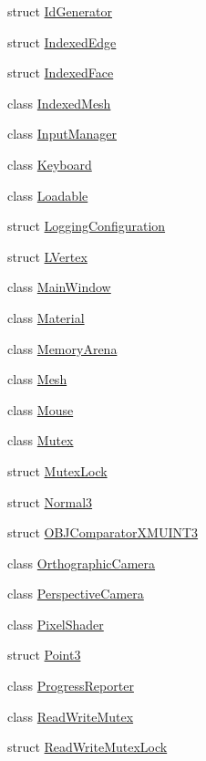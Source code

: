 \begin{DoxyCompactItemize}
struct \hyperlink{structmage_1_1_id_generator}{Id\+Generator}
\item 
struct \hyperlink{structmage_1_1_indexed_edge}{Indexed\+Edge}
\item 
struct \hyperlink{structmage_1_1_indexed_face}{Indexed\+Face}
\item 
class \hyperlink{classmage_1_1_indexed_mesh}{Indexed\+Mesh}
\item 
class \hyperlink{classmage_1_1_input_manager}{Input\+Manager}
\item 
class \hyperlink{classmage_1_1_keyboard}{Keyboard}
\item 
class \hyperlink{classmage_1_1_loadable}{Loadable}
\item 
struct \hyperlink{structmage_1_1_logging_configuration}{Logging\+Configuration}
\item 
struct \hyperlink{structmage_1_1_l_vertex}{L\+Vertex}
\item 
class \hyperlink{classmage_1_1_main_window}{Main\+Window}
\item 
class \hyperlink{classmage_1_1_material}{Material}
\item 
class \hyperlink{classmage_1_1_memory_arena}{Memory\+Arena}
\item 
class \hyperlink{classmage_1_1_mesh}{Mesh}
\item 
class \hyperlink{classmage_1_1_mouse}{Mouse}
\item 
class \hyperlink{classmage_1_1_mutex}{Mutex}
\item 
struct \hyperlink{structmage_1_1_mutex_lock}{Mutex\+Lock}
\item 
struct \hyperlink{structmage_1_1_normal3}{Normal3}
\item 
struct \hyperlink{structmage_1_1_o_b_j_comparator_x_m_u_i_n_t3}{O\+B\+J\+Comparator\+X\+M\+U\+I\+N\+T3}
\item 
class \hyperlink{classmage_1_1_orthographic_camera}{Orthographic\+Camera}
\item 
class \hyperlink{classmage_1_1_perspective_camera}{Perspective\+Camera}
\item 
class \hyperlink{classmage_1_1_pixel_shader}{Pixel\+Shader}
\item 
struct \hyperlink{structmage_1_1_point3}{Point3}
\item 
class \hyperlink{classmage_1_1_progress_reporter}{Progress\+Reporter}
\item 
class \hyperlink{classmage_1_1_read_write_mutex}{Read\+Write\+Mutex}
\item 
struct \hyperlink{structmage_1_1_read_write_mutex_lock}{Read\+Write\+Mutex\+Lock}

\end{DoxyCompactItemize}
